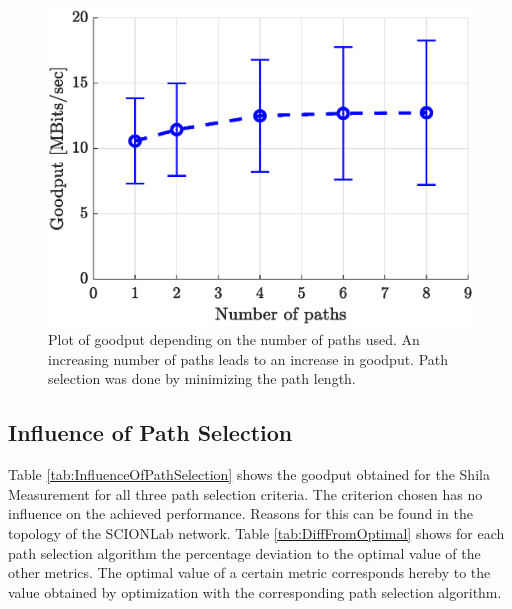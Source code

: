 \begin{figure}
	\begin{center}
		\includegraphics[scale=0.65]{../illustrations/performanceEvaluation/PerformanceWrtPathShortestpath.eps}  
		\caption[Caption for the list of figures.]{Plot of goodput depending on the number of paths used. An increasing number of paths leads to an increase in goodput. Path selection was done by minimizing the path length.}
		\label{fig:GoodputWrtToNOfPathsForShortestPath}
	\end{center}
\end{figure}

\subsection*{Influence of Path Selection}
\label{subsec:InfluencePathSelection}

Table \ref{tab:InfluenceOfPathSelection} shows the goodput obtained for the Shila Measurement for all three path selection criteria. The criterion chosen has no influence on the achieved performance. Reasons for this can be found in the topology of the SCIONLab network. Table \ref{tab:DiffFromOptimal}  shows for each path selection algorithm the percentage deviation to the optimal value of the other metrics. The optimal value of a certain metric corresponds hereby to the value obtained by optimization with the corresponding path selection algorithm. 

